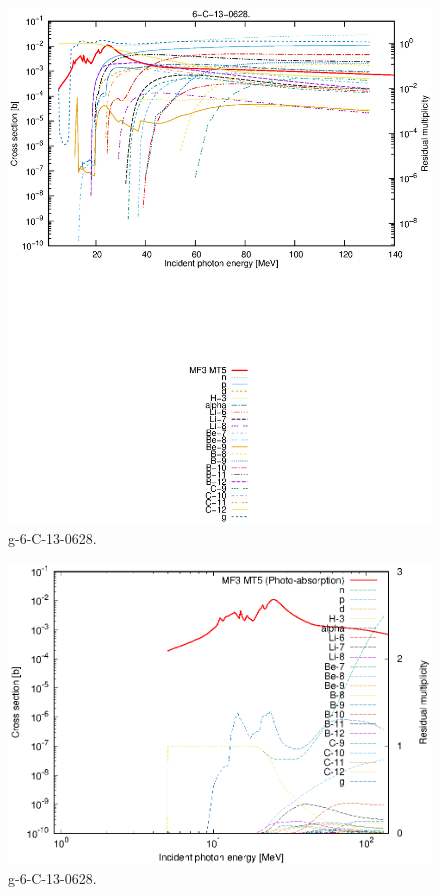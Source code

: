 \begin{figure}
 \includegraphics[width=\linewidth]{eps/g_6-C-13_0628.eps}
  \caption{g-6-C-13-0628.}
\end{figure}
\newpage \clearpage

\begin{figure}
 \includegraphics[width=\linewidth]{eps-log/g_6-C-13_0628.eps}
 \caption{g-6-C-13-0628.}
\end{figure}
\newpage \clearpage

